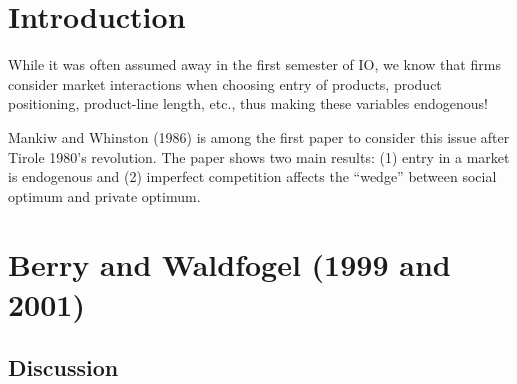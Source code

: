 \section{Introduction}

While it was often assumed away in the first semester of IO, we know that firms consider market interactions when choosing entry of products, product positioning, product-line length, etc., thus making these variables endogenous!

Mankiw and Whinston (1986) is among the first paper to consider this issue after Tirole 1980's revolution. The paper shows two main results: (1) entry in a market is endogenous and (2) imperfect competition affects the ``wedge'' between social optimum and private optimum.

\section{Berry and Waldfogel (1999 and 2001)}

\subsection{Discussion}


